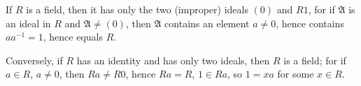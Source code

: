 If $R$ is a field, then it has only the two (improper) ideals $(0)$ and $R1$, for if $\mathfrak{A}$ is an ideal in $R$ and $\mathfrak{A} \neq (0)$, then $\mathfrak{A}$ contains an element $a \neq 0$, hence contains $aa^{-1} = 1$, hence equals $R$.

Conversely, if $R$ has an identity and has only two ideals, then $R$ is a field; for if $a \in R$, $a \neq 0$, then $Ra \neq R0$, hence $Ra = R$, $1 \in Ra$, so $1 = xa$ for some $x \in R$.
